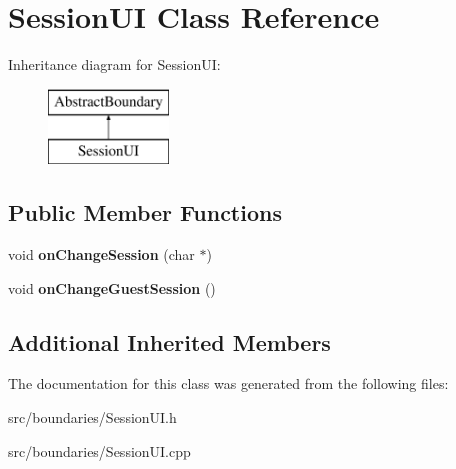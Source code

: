\hypertarget{class_session_u_i}{}\section{Session\+UI Class Reference}
\label{class_session_u_i}
Inheritance diagram for Session\+UI\+:\begin{figure}[H]
\begin{center}
\leavevmode
\includegraphics[height=2.000000cm]{class_session_u_i}
\end{center}
\end{figure}
\subsection*{Public Member Functions}
\begin{DoxyCompactItemize}
\item 
\mbox{\label{class_session_u_i_a32778b6a6b4323e9c067b37903906fcf}} 
void {\bfseries on\+Change\+Session} (char $\ast$)
\item 
\mbox{\label{class_session_u_i_a9d92daa17c05d5c2eaf13a53b9edf13d}} 
void {\bfseries on\+Change\+Guest\+Session} ()
\end{DoxyCompactItemize}
\subsection*{Additional Inherited Members}


The documentation for this class was generated from the following files\+:\begin{DoxyCompactItemize}
\item 
src/boundaries/Session\+U\+I.\+h\item 
src/boundaries/Session\+U\+I.\+cpp\end{DoxyCompactItemize}
